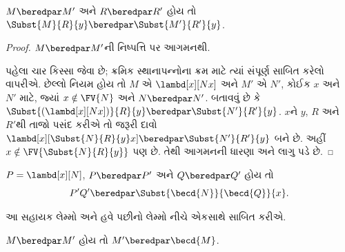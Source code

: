 \begin{lem}
  $M \beredpar M'$ અને $R \beredpar R'$ હોય તો
  $\Subst{M}{R}{y} \beredpar
  \Subst{M'}{R'}{y}$.
\end{lem}

\begin{proof}
  $M \beredpar M'$ની નિષ્પત્તિ પર આગમનથી.

  પહેલા ચાર કિસ્સા  જેવા છે;
  ક્રમિક સ્થાનાપન્નોના ક્રમ માટે ત્યાં સંપૂર્ણ સાબિત કરેલો
   વાપરીએ. છેલ્લો નિયમ
   હોય તો
  $M$ એ $\lambd[x][Nx]$ અને $M'$ એ $N'$, કોઈક
  $x$ અને~$N'$ માટે, જ્યાં $x \notin \FV{N}$ અને
  $N \beredpar N'$. બતાવવું છે કે
  $\Subst{(\lambd[x][Nx])}{R}{y} \beredpar
  \Subst{N'}{R'}{y}$. $x$ને $y$, $R$ અને~$R'$થી
  તાજો પસંદ કરીએ તો જરૂરી દાવો
  $\lambd[x][\Subst{N}{R}{y} x] \beredpar
  \Subst{N'}{R'}{y}$ બને છે. અહીં
  $x \notin \FV{\Subst{N}{R}{y}}$ પણ છે.
  તેથી આગમનની ધારણા અને
  લાગુ પડે છે.
\end{proof}

\begin{lem}
  $P=\lambd[x][N]$, $P\beredpar P'$ અને
  $Q\beredpar Q'$ હોય તો
  \[
  P'Q'\beredpar
  \Subst{\becd{N}}{\becd{Q}}{x}.
  \]
\end{lem}
આ સહાયક લેમ્મો અને હવે પછીનો લેમ્મો નીચે એકસાથે સાબિત કરીએ.

\begin{lem}
  $M \beredpar M'$ હોય તો
  $M' \beredpar \becd{M}$.
\end{lem}


